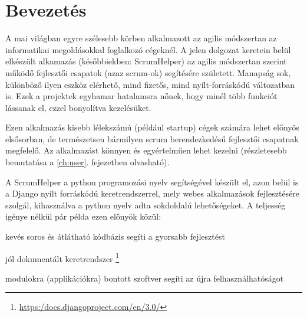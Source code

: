\chapter{Bevezetés} %
\label{ch:intro}

A mai világban egyre szélesebb körben alkalmazott az agilis módszertan az informatikai megoldásokkal foglalkozó cégeknél. A jelen dolgozat keretein belül elkészült alkamazás (későbbiekben: ScrumHelper) az agilis módszertan szerint működő fejlesztői csapatok (azaz scrum-ok) segítésére született. Manapság sok, különböző ilyen eszköz elérhető, mind fizetős, mind nyílt-forráskódú változatban is. Ezek a projektek egyhamar hatalamsra nőnek, hogy minél több funkciót lássanak el, ezzel bonyolítva kezelésüket.

 Ezen alkalmazás kisebb lélekszámú (például startup) cégek számára lehet előnyös elsősorban, de természetsen bármilyen scrum berendezkedésű fejlesztői csapatnak megfelelő. Az alkalmazást könnyen és egyértelműen lehet kezelni (részletesebb bemutatása a \ref{ch:user}. fejezetben olvasható). 

A ScrumHelper a python programozási nyelv segítségével készült el, azon belül is a Django nyílt forráskódú keretrendszerrel, mely webes alkalmazások fejlesztésére szolgál, kihasználva a python nyelv adta  sokdoldalú lehetőségeket. A teljesség igénye nélkül pár példa ezen előnyök közül: 
\begin{compactitem}
	\item kevés soros és átlátható  kódbázis segíti a gyorsabb fejlesztést
	\item jól dokumentált keretrendszer \footnote{\url{https:/docs.djangoproject.com/en/3.0/}}
	\item modulokra (applikációkra) bontott szoftver segíti az újra felhasználhatóságot
\end{compactitem}

